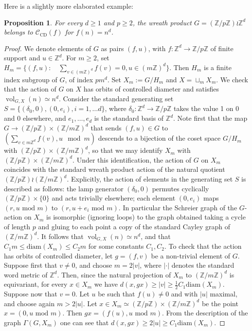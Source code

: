 \documentclass[11pt]{amsart}
\newcommand{\Z}{\ensuremath{\mathbb{Z}}}%
\newcommand{\vol}{\ensuremath{\operatorname{vol}}}%
\newcommand{\Class}{\ensuremath{\mathcal{C}}}
\theoremstyle{definition}
\theoremstyle{plain}
\newtheorem{prop}[defin]{Proposition}
\theoremstyle{remark}
\begin{document}
Here is a slightly more elaborated example:

\begin{prop} \label{prop-wreath-LD}
For every $d \ge 1$ and $p \geq 2$, the wreath product $G=(\Z/p\Z)\wr \Z^d$  belongs to $\Class_{\mathrm{CD}}(f)$ for $f(n)=n^d$. 
\end{prop}

\begin{proof}
	We denote elements of $G$ as pairs $(f, u)$, with  $f\colon \Z^d\to \Z/p\Z$ of finite support and $u\in \Z^d$. For $m\ge 2$, set $H_m=\{(f, u) \colon \quad \sum_{v\in (m\Z)^d} f(v)=0, u\in (m\Z)^d\}$. Then $H_m$ is a finite index subgroup of $G$, of index $pm^d$. Set $X_m:=G/H_m$ and $X=\sqcup_m  X_m$. We check that the action of $G$ on $X$ has orbits of controlled diameter and satisfies $\vol_{G, X}(n)\simeq n^d$. Consider the standard generating set $S=\{(\delta_0, 0), (0, e_i), i=1, \dots d\}$, where $\delta_0\colon \Z^d\to \Z/p\Z$ takes the value 1 on $0$ and 0 elsewhere, and $e_1, \ldots, e_d$ is the standard basis of $\Z^d$. Note first that the map $G\to (\Z/p\Z)\times (\Z/m\Z)^d$ that sends $(f, u)\in G$  to $(\sum_{v\in m\Z^d} f(v), u \mod m)$ descends to a bijection of the coset space $G/H_m$ with $(\Z/p\Z)\times (\Z/m\Z)^d$, so that we may identify $X_m$ with $(\Z/p\Z)\times (\Z/m\Z)^d$. Under this identification, the action of $G$ on $X_m$ coincides with the standard wreath product action of the natural quotient $(\Z/p\Z) \wr (\Z/m\Z)^d$. Explicitly, the action of elements in the generating set $S$ is described as follows: the lamp generator $(\delta_0 , 0)$ permutes cyclically $(\Z/p\Z)\times \{0\}$ and acts trivially elsewhere; each element $(0, e_i)$ maps $(r, u \text{ mod } m)$ to $(r, u+e_i \text{ mod } m)$.  In particular the Schreier graph of the $G$-action on $X_m$ is isomorphic (ignoring loops) to the graph obtained taking  a cycle of length $p$ and gluing to each  point a copy of the standard Cayley graph of $(\Z/ m\Z)^d$.  It follows that $\vol_{G, X}(n)\simeq n^d$, and that $C_1m \le \mathrm{diam}(X_m)\le C_2 m$ for some constants $C_1, C_2$. To check that the action has orbits of controlled diameter, let $g=(f, v)$ be a non-trivial element of $G$. Suppose first that $v\neq 0$, and choose $m=2|v|$, where $|\cdot|$ denotes the standard word metric of $\Z^d$. Then, since the natural projection of $X_m$ to $(\Z/m\Z)^d$ is equivariant, for every $x\in X_m$ we have $d(x, gx) \ge |v|\ge \frac{1}{2}C_1\mathrm{diam}(X_m)$. Suppose now that $v=0$. Let $u$ be such that $f(u)\neq 0$ and with $|u|$ maximal, and choose again $m>2|u|$. Let $x\in X_m\simeq (\Z/p\Z)\times (\Z/m\Z)^d$ be the point $x=(0, u \text{ mod } m)$. Then $gx=(f(u),  u \text{ mod } m)$.   From the description of the graph $\Gamma(G, X_m)$ one can see that $d(x, gx)\ge 2|u| \ge C_1 \mathrm{diam}(X_m)$. 
\end{proof}
\end{document}
